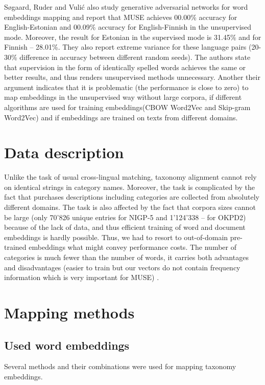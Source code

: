 \documentclass[11pt,a4paper]{article}
\begin{document}
Søgaard, Ruder and Vulić \cite{ruder-muse-limitations} also study generative adversarial networks for word embeddings mapping and report that MUSE achieves 00.00\% accuracy for English-Estonian and 00.09\% accuracy for English-Finnish in the unsupervised mode. Moreover, the result for Estonian in the supervised mode is 31.45\% and for Finnish -- 28.01\%. They also report extreme variance for these language pairs (20-30\% difference in accuracy between different random seeds). The authors state that supervision in the form of identically spelled words achieves the same or better results, and thus renders unsupervised methods unnecessary. Another their argument indicates that it is problematic (the performance is close to zero) to map embeddings in the unsupervised way without large corpora, if different algorithms are used for training embeddings(CBOW Word2Vec and Skip-gram Word2Vec) and if embeddings are trained on texts from different domains.


\section{Data description}


Unlike the task of usual cross-lingual matching, taxonomy alignment cannot rely on identical strings in category names. Moreover, the task is complicated by the fact that purchases descriptions including categories are collected from absolutely different domains. The task is also affected by the fact that corpora sizes cannot be large (only 70'826 unique entries for NIGP-5 and 1'124'338 -- for OKPD2) because of the lack of data, and thus efficient training of word and document embeddings is hardly possible. Thus, we had to resort to out-of-domain pre-trained embeddings what might convey performance costs. The number of categories is much fewer than the number of words, it carries both advantages and disadvantages (easier to train but our vectors do not contain frequency information which is very important for MUSE) \cite{ruder-muse-limitations}.

\section{Mapping methods}

\subsection{Used word embeddings}

Several methods and their combinations were used for mapping taxonomy embeddings.
\end{document}

